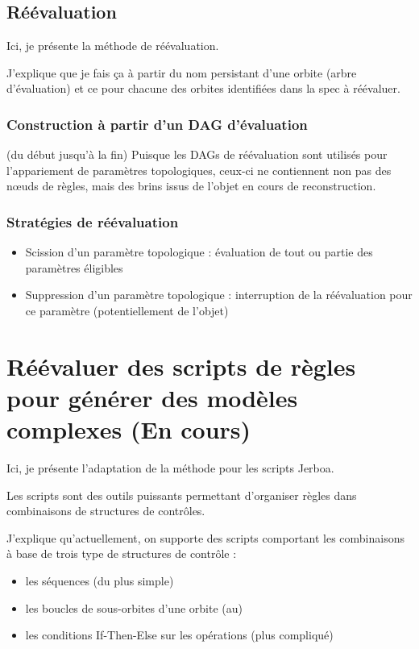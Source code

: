 \documentclass[11pt]{article}
\begin{document}
\subsection{Réévaluation}
\label{sec:org4a77fd6}
Ici, je présente la méthode de réévaluation.

J'explique que je fais ça à partir du nom persistant d'une orbite (arbre
d'évaluation) et ce pour chacune des orbites identifiées dans la spec à
réévaluer.
\subsubsection{Construction à partir d'un DAG d'évaluation}
\label{sec:orgfb58d74}
(du début jusqu'à la fin)
Puisque les DAGs de réévaluation sont utilisés pour l'appariement de paramètres
topologiques, ceux-ci ne contiennent non pas des nœuds de règles, mais des brins
issus de l'objet en cours de reconstruction.
\subsubsection{Stratégies de réévaluation}
\label{sec:orge8a7429}
\begin{itemize}
\item Scission d'un paramètre topologique : évaluation de tout ou partie des paramètres éligibles
\item Suppression d'un paramètre topologique : interruption de la réévaluation pour ce paramètre (potentiellement de l'objet)
\end{itemize}
\section{Réévaluer des scripts de règles pour générer des modèles complexes (En cours)}
\label{sec:org0c2f7ec}
Ici, je présente l'adaptation de la méthode pour les scripts Jerboa.

Les scripts sont des outils puissants permettant d'organiser règles dans combinaisons de structures de contrôles.

J'explique qu'actuellement, on supporte des scripts comportant les combinaisons à base de trois type de structures de contrôle :
\begin{itemize}
\item les séquences (du plus simple)
\item les boucles de sous-orbites d'une orbite (au)
\item les conditions If-Then-Else sur les opérations (plus compliqué)
\end{itemize}
\end{document}
